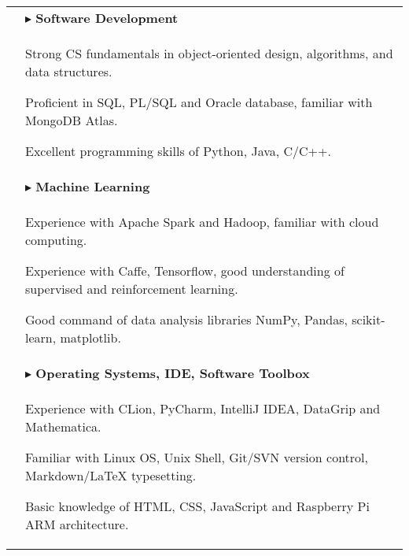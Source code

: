 \documentclass[$if(fontsize)$$fontsize$,$endif$$if(lang)$$babel-lang$,$endif$$if(papersize)$$papersize$paper,$endif$$for(classoption)$$classoption$$sep$,$endfor$]{$documentclass$}
\renewenvironment{itemize}{
  \begin{list}{}{
    \setlength{\leftmargin}{1em}  %
  }
}{
  \end{list}
}
\begin{document}
\begin{tabular}{>{\centering}p{2.5cm}|p{16.5cm}}
    \midrule
    \multirow{17}{*}{\parbox{2.5cm}{\centering\small\textbf{TECHNICAL SKILLS}}}
    & \(\blacktriangleright\) \textbf{Software Development}\\
    & \vspace{-2mm}
      \begin{itemize}
        \item[\textbullet] Strong CS fundamentals in object-oriented design, algorithms, and data structures.
        \item[\textbullet] Proficient in SQL, PL/SQL and Oracle database, familiar with MongoDB Atlas.
        \item[\textbullet] Excellent programming skills of Python, Java, C/C++.
      \vspace{-4mm}
      \end{itemize}\\
    & \vspace{-3mm}
    \(\blacktriangleright\) \textbf{Machine Learning}\\
    & \vspace{-2mm}
      \begin{itemize}
        \item[\textbullet] Experience with Apache Spark and Hadoop, familiar with cloud computing.
        \item[\textbullet] Experience with Caffe, Tensorflow, good understanding of supervised and reinforcement learning.
        \item[\textbullet] Good command of data analysis libraries NumPy, Pandas, scikit-learn, matplotlib.
      \vspace{-4mm}
      \end{itemize}\\
    & \vspace{-3mm}
    \(\blacktriangleright\) \textbf{Operating Systems, IDE, Software Toolbox}\\
    & \vspace{-2mm}
      \begin{itemize}
        \item[\textbullet] Experience with CLion, PyCharm, IntelliJ IDEA, DataGrip and Mathematica.
        \item[\textbullet] Familiar with Linux OS, Unix Shell, Git/SVN version control, Markdown/LaTeX typesetting.
        \item[\textbullet] Basic knowledge of HTML, CSS, JavaScript and Raspberry Pi ARM architecture.
      \vspace{-4mm}
      \end{itemize}\\

\end{tabular}
\end{document}
